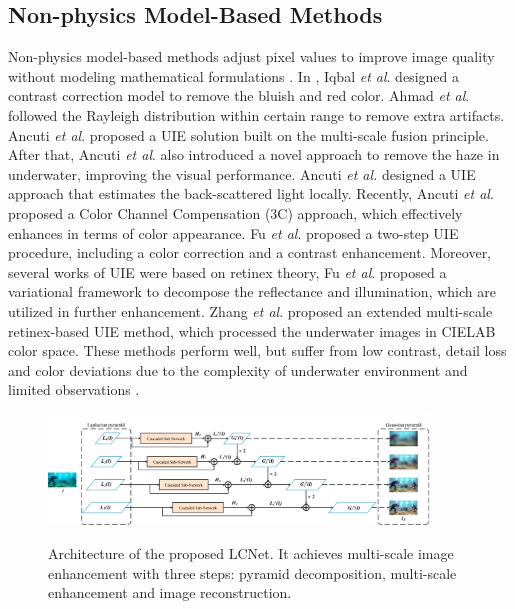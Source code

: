 \documentclass[journal]{IEEEtran}
\begin{document}
\subsection{Non-physics Model-Based Methods}
Non-physics model-based methods adjust pixel values to improve image quality without modeling mathematical formulations \cite{iqbal2010enhancing,ghani2015underwater,fusion-based,fu2017two,fu2014retinex,zhang2017underwater}. In \cite{iqbal2010enhancing}, Iqbal \textit{et al}. designed a contrast correction model to remove the bluish and red color. Ahmad \textit{et al}. \cite{ghani2015underwater} followed the Rayleigh distribution within certain range to remove extra artifacts. Ancuti \textit{et al}. \cite{fusion-based} proposed a UIE solution built on the multi-scale fusion principle. After that, Ancuti \textit{et al}. \cite{ancuti2017color} also introduced a novel approach to remove the haze in underwater, improving the visual performance. Ancuti \textit{et al.} \cite{ancuti2016multi} designed a UIE approach that estimates the back-scattered light locally. Recently, Ancuti \textit{et al}. \cite{ancuti2019color} proposed a Color Channel Compensation (3C) approach, which effectively enhances in terms of color appearance. Fu \textit{et al}. \cite{fu2017two} proposed a two-step UIE procedure,  including a color correction and a contrast enhancement. Moreover, several works  \cite{fu2014retinex,zhang2017underwater} of UIE were based on retinex theory, Fu \textit{et al}. \cite{fu2014retinex} proposed a variational framework to decompose the reflectance and illumination, which are utilized in further enhancement. Zhang \textit{et al}. \cite{zhang2017underwater} proposed an extended multi-scale retinex-based UIE method, which processed the underwater images in CIELAB color space. These methods perform well, but suffer from low contrast, detail loss and color deviations due to the complexity of underwater environment and limited observations \cite{liu2020real}.
\begin{figure}[h] 
\centering 
{   
\includegraphics[width=0.9\textwidth]{Figs/Fig2.png}
}          
\caption{Architecture of the proposed LCNet. It achieves multi-scale image enhancement with three steps:
pyramid decomposition, multi-scale enhancement and image
reconstruction.}
\label{Fig2} 
\end{figure} 
\end{document}
